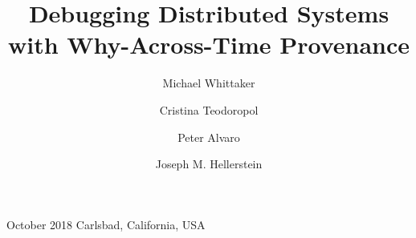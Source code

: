 \documentclass[sigconf, 10pt]{acmart}
\begin{document}
\title{Debugging Distributed Systems with Why-Across-Time Provenance}
%
              {October 2018}%
              {Carlsbad, California, USA}

\author{Michael Whittaker}

\author{Cristina Teodoropol}

\author{Peter Alvaro}

\author{Joseph M. Hellerstein}
\renewcommand{\shortauthors}{M. Whittaker et al.}

{}
\maketitle
{}
{}
{}
{}
{}
{}
{}
{}



\end{document}
